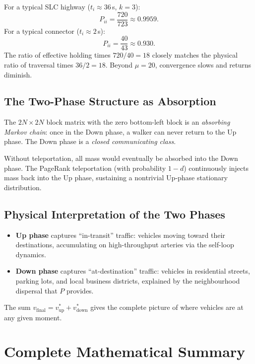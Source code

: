 \documentclass[12pt,a4paper]{article}
\theoremstyle{definition}
\theoremstyle{plain}
\newcommand{\vup}{v_{\mathrm{up}}}
\newcommand{\vdown}{v_{\mathrm{down}}}
\newcommand{\vf}{v_{\mathrm{final}}}
\begin{document}
For a typical SLC highway ($t_i \approx 36$\,s, $k = 3$):
\[
  P_{ii} = \frac{720}{723} \approx 0.9959.
\]
For a typical connector ($t_i \approx 2$\,s):
\[
  P_{ii} = \frac{40}{43} \approx 0.930.
\]
The ratio of effective holding times $720/40 = 18$ closely matches the physical ratio
of traversal times $36/2 = 18$. Beyond $\mu=20$, convergence slows and returns diminish.

\subsection{The Two-Phase Structure as Absorption}

The $2N \times 2N$ block matrix with the zero bottom-left block is an \emph{absorbing
Markov chain}: once in the Down phase, a walker can never return to the Up phase. The
Down phase is a \emph{closed communicating class}.

Without teleportation, all mass would eventually be absorbed into the Down phase.
The PageRank teleportation (with probability $1-d$) continuously injects mass back into
the Up phase, sustaining a nontrivial Up-phase stationary distribution.

\subsection{Physical Interpretation of the Two Phases}

\begin{itemize}
  \item \textbf{Up phase} captures ``in-transit'' traffic: vehicles moving toward their
    destinations, accumulating on high-throughput arteries via the self-loop dynamics.
  \item \textbf{Down phase} captures ``at-destination'' traffic: vehicles in residential
    streets, parking lots, and local business districts, explained by the neighbourhood
    dispersal that $P$ provides.
\end{itemize}

The sum $\vf = \vup^* + \vdown^*$ gives the complete picture of where vehicles are at
any given moment.

\section{Complete Mathematical Summary}
\label{sec:summary}
\end{document}
